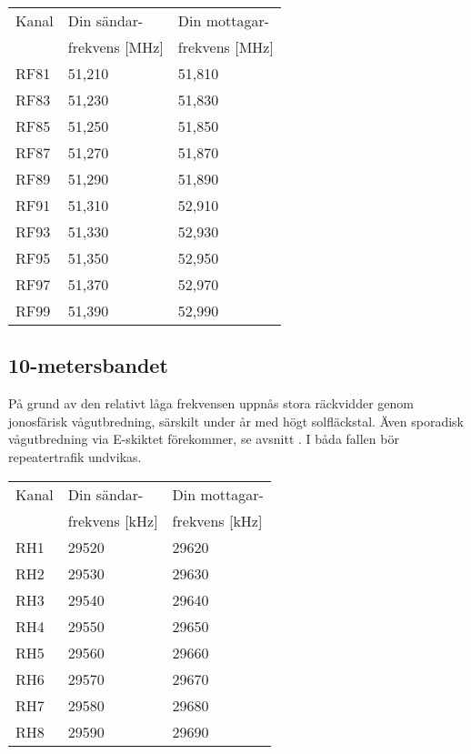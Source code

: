 \bigskip

\begin{tabular}{ l | l | l }
  Kanal & Din sändar- & Din mottagar- \\
        & frekvens [\si{\mega\hertz}] & frekvens [\si{\mega\hertz}] \\
  \hline
  RF81 & 51,210 & 51,810 \\
  RF83 & 51,230 & 51,830 \\
  RF85 & 51,250 & 51,850 \\
  RF87 & 51,270 & 51,870 \\
  RF89 & 51,290 & 51,890 \\
  RF91 & 51,310 & 52,910 \\
  RF93 & 51,330 & 52,930 \\
  RF95 & 51,350 & 52,950 \\
  RF97 & 51,370 & 52,970 \\
  RF99 & 51,390 & 52,990 \\
\end{tabular}



\subsection{10-metersbandet}

På grund av den relativt låga frekvensen uppnås stora räckvidder genom
jonosfärisk vågutbredning, särskilt under år med högt solfläckstal.
Även sporadisk vågutbredning via E-skiktet förekommer, se avsnitt
. I båda fallen bör repeatertrafik undvikas.

\bigskip

\begin{tabular}{ l | l | l }
  Kanal & Din sändar- & Din mottagar- \\
        & frekvens [\si{\kilo\hertz}] & frekvens [\si{\kilo\hertz}] \\
  \hline
  RH1 & 29520 & 29620 \\
  RH2 & 29530 & 29630 \\
  RH3 & 29540 & 29640 \\
  RH4 & 29550 & 29650 \\
  RH5 & 29560 & 29660 \\
  RH6 & 29570 & 29670 \\
  RH7 & 29580 & 29680 \\
  RH8 & 29590 & 29690 \\
\end{tabular}
